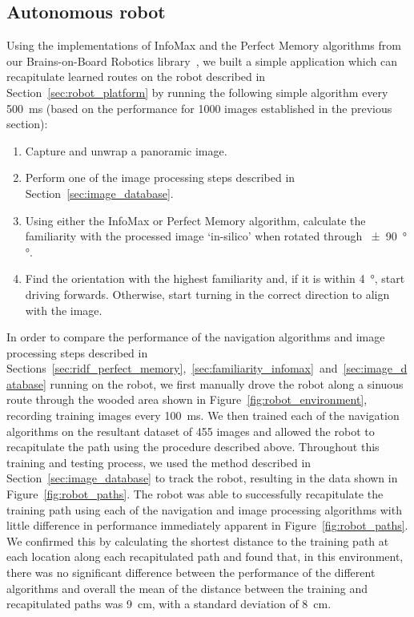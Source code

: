 \documentclass[letterpaper]{article}
\begin{document}
\subsection{Autonomous robot}
Using the implementations of InfoMax and the Perfect Memory algorithms from our Brains-on-Board Robotics library~\citep{Dewar2017}, we built a simple application which can recapitulate learned routes on the robot described in Section~\ref{sec:robot_platform} by running the following simple algorithm every \SI{500}{\milli\second} (based on the performance for 1000 images established in the previous section):
%
\begin{enumerate}
    \item Capture and unwrap a panoramic image.
    \item Perform one of the image processing steps described in Section~\ref{sec:image_database}.
    \item Using either the InfoMax or Perfect Memory algorithm, calculate the familiarity with the processed image ‘in-silico’ when rotated through \SI{\pm 90}{\degree}°.
    \item Find the orientation with the highest familiarity and, if it is within \SI{4}{\degree}, start driving forwards. Otherwise, start turning in the correct direction to align with the image.
\end{enumerate}
%
In order to compare the performance of the navigation algorithms and image processing steps described in Sections~\ref{sec:ridf_perfect_memory},~\ref{sec:familiarity_infomax}~and~\ref{sec:image_database} running on the robot, we first manually drove the robot along a sinuous route through the wooded area shown in Figure~\ref{fig:robot_environment}, recording training images every \SI{100}{\milli\second}.
We then trained each of the navigation algorithms on the resultant dataset of \num{455} images and allowed the robot to recapitulate the path using the procedure described above.
Throughout this training and testing process, we used the method described in Section~\ref{sec:image_database} to track the robot, resulting in the data shown in Figure~\ref{fig:robot_paths}.
The robot was able to successfully recapitulate the training path using each of the navigation and image processing algorithms with little difference in performance immediately apparent in Figure~\ref{fig:robot_paths}.
We confirmed this by calculating the shortest distance to the training path at each location along each recapitulated path and found that, in this environment, there was no significant difference between the performance of the different algorithms and overall the mean of the distance between the training and recapitulated paths was \SI{9}{\centi\metre}, with a standard deviation of \SI{8}{\centi\metre}.
\end{document}
